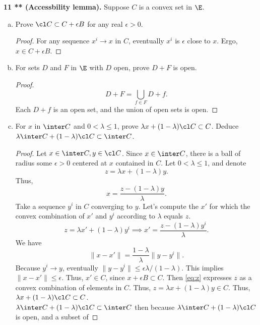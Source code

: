\documentclass[12pt, letterpaper]{article}
\numberwithin{equation}{subsection}
\begin{document}
\textbf{11 ** (Accessbility lemma).} Suppose $C$ is a convex set in $\E$.
\begin{enumerate}[(a)]
\item Prove $\cl C\subset C + \epsilon B$ for any real $\epsilon > 0$.
\begin{proof}
For any sequence $x^i\to x$ in $C$, eventually $x^i$ is $\epsilon$ 
close to $x$. Ergo, $x\in C+\epsilon B$.
\end{proof}
\item For sets $D$ and $F$ in $\E$ with $D$ open, prove $D+F$ is open.
\begin{proof}
\begin{equation*}
D+F = \bigcup_{f\in F} D+f.
\end{equation*}
Each $D+f$ is an open set, and the union of open sets is open.
\end{proof}
\item For $x$ in $\inter C$ and $0<\lambda\leq1$, prove $\lambda x + 
(1-\lambda)\cl C\subset C$. Deduce $\lambda\inter C + (1-\lambda)\cl C
\subset \inter C$.
\begin{proof}
Let $x\in\inter C, y\in \cl C$. Since $x\in \inter C$, there is a ball 
of radius some $\epsilon > 0$ centered at $x$ contained in $C$. Let 
$0< \lambda \leq 1$, and denote 
\begin{equation*}
z = \lambda x + (1-\lambda) y.
\end{equation*}
Thus, 
\begin{equation*}
x = \frac{z-(1-\lambda)y}{\lambda}.
\end{equation*}
Take a sequence $y^i$ in $C$ converging to $y$. Let's compute the 
$x'$ for which the convex combination of $x'$ and $y^i$ according to 
$\lambda$ equals $z$. 
\begin{equation}
\label{eq:z}
z = \lambda x' + (1-\lambda)y^i \implies x' = \frac{z-(1-\lambda)y^i}{
\lambda}.
\end{equation}
We have 
\begin{equation*}
\|x-x'\| = \frac{1-\lambda}{\lambda}\|y-y^i\|.
\end{equation*}
Because $y^i\to y$, eventually $\|y-y^i\| \leq \epsilon
\lambda/(1-\lambda)$. This implies $\|x-x'\|\leq \epsilon$. Thus, 
$x'\in C$, since $x+\epsilon B\subset C$. Then \eqref{eq:z} expresses
$z$ as a convex combination of elements in $C$. Thus, $z
= \lambda x + (1-\lambda)y\in C$. Thus, $\lambda x+(1-\lambda)\cl C
\subset C$. \\
$\lambda\inter C + (1-\lambda)\cl C \subset \inter C$ then because 
$\lambda\inter C + (1-\lambda)\cl C$ is open, and a subset of 

\end{proof}
\end{enumerate}
\end{document}
